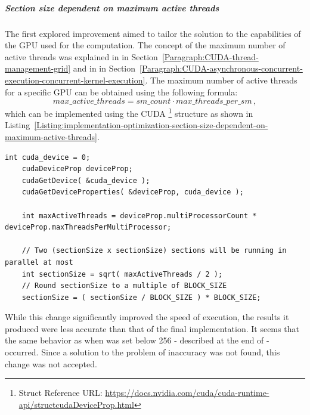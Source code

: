 \subparagraph{Section size dependent on maximum active threads}\label{Subparagraph:implementation-optimization-section-size-dependent-on-maximum-active-threads}
The first explored improvement aimed to tailor the solution to the capabilities of the GPU used for the computation. The concept of the maximum number of active threads was explained in \textit{} in Section~\ref{Paragraph:CUDA-thread-management-grid} and in \textit{} in Section~\ref{Paragraph:CUDA-asynchronous-concurrent-execution-concurrent-kernel-execution}. The maximum number of active threads for a specific GPU can be obtained using the following formula:
\begin{equation}
	max\_active\_threads = sm\_count\cdot max\_threads\_per\_sm \nonumber\,,
\end{equation}
which can be implemented using the CUDA \footnote{ Struct Reference URL: \url{https://docs.nvidia.com/cuda/cuda-runtime-api/structcudaDeviceProp.html}} structure as shown in Listing~\ref{Listing:implementation-optimization-section-size-dependent-on-maximum-active-threads}.

\begin{lstlisting}[caption={Code detailing the calculation of the size of a section based on the the maximum number of active threads for a given GPU. The structure \code{cudaDeviceProp} contains properties and information about the given CUDA device. Taken from the Decomposition project repository on GitLab\protect\footref{Footnote:decomposition-project-gitlab-url}.},label={Listing:implementation-optimization-section-size-dependent-on-maximum-active-threads},escapechar=@]
	int cuda_device = 0;
	cudaDeviceProp deviceProp;
	cudaGetDevice( &cuda_device );
	cudaGetDeviceProperties( &deviceProp, cuda_device );
	
	int maxActiveThreads = deviceProp.multiProcessorCount * deviceProp.maxThreadsPerMultiProcessor;
	
	// Two (sectionSize x sectionSize) sections will be running in parallel at most
	int sectionSize = sqrt( maxActiveThreads / 2 );
	// Round sectionSize to a multiple of BLOCK_SIZE
	sectionSize = ( sectionSize / BLOCK_SIZE ) * BLOCK_SIZE;
\end{lstlisting}

While this change significantly improved the speed of execution, the results it produced were less accurate than that of the final implementation. It seems that the same behavior as when  was set below 256 - described at the end of \textit{} - occurred. Since a solution to the problem of inaccuracy was not found, this change was not accepted.

